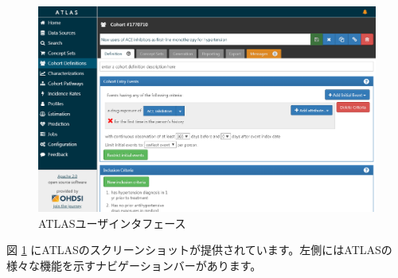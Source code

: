 \documentclass[
  11pt]{book}
\theoremstyle{definition}
\theoremstyle{definition}
\theoremstyle{definition}
\theoremstyle{definition}
\theoremstyle{remark}
\begin{document}
\begin{figure}

{\centering \includegraphics[width=1\linewidth]{images/OhdsiAnalyticsTools/atlas} 

}

\caption{ATLASユーザインタフェース}\label{fig:atlas}
\end{figure}

図 \ref{fig:atlas} にATLASのスクリーンショットが提供されています。左側にはATLASの様々な機能を示すナビゲーションバーがあります。
\end{document}
